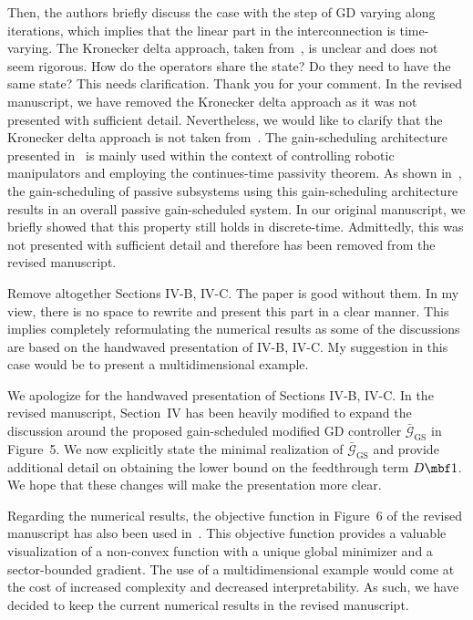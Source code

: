 \begin{rebuttal}[pending]
    {%
        Then, the authors briefly discuss the case with the step of GD varying along iterations, which implies that the linear part in the interconnection is time-varying. The Kronecker delta approach, taken from~\cite{Damaren_spr_gain_scheduling_1996}, is unclear and does not seem rigorous. How do the operators share the state? Do they need to have the same state? This needs clarification. 
    }%
    {%
        Thank you for your comment. In the revised manuscript, we have removed the Kronecker delta approach as it was not presented with sufficient detail. Nevertheless, we would like to clarify that the Kronecker delta approach is not taken from~\cite{Damaren_spr_gain_scheduling_1996}. The gain-scheduling architecture presented in~\cite{Damaren_spr_gain_scheduling_1996} is mainly used within the context of controlling robotic manipulators and employing the continues-time passivity theorem. As shown in~\cite{Damaren_spr_gain_scheduling_1996}, the gain-scheduling of passive subsystems using this gain-scheduling architecture results in an overall passive gain-scheduled system. In our original manuscript, we briefly showed that this property still holds in discrete-time. Admittedly, this was not presented with sufficient detail and therefore has been removed from the revised manuscript.
    }%
\end{rebuttal}
\begin{rebuttal}[pending]
    {%
        Remove altogether Sections IV-B, IV-C. The paper is good without them. In my view, there is no space to rewrite and present this part in a clear manner. This implies completely reformulating the numerical results as some of the discussions are based on the handwaved presentation of IV-B, IV-C. My suggestion in this case would be to present a multidimensional example. 
    }%
    {%
        We apologize for the handwaved presentation of Sections IV-B, IV-C. In the revised manuscript, Section~IV has been heavily modified to expand the discussion around the proposed gain-scheduled modified GD controller \(\bar{\bm{\mathcal{G}}}_{\textrm{GS}}\) in Figure~5. We now explicitly state the minimal realization of \(\bar{\bm{\mathcal{G}}}_{\textrm{GS}}\) and provide additional detail on obtaining the lower bound on the feedthrough term \(D\eye\). We hope that these changes will make the presentation more clear.

        Regarding the numerical results, the objective function in Figure~6 of the revised manuscript has also been used in~\cite{ugrinovskii,alex_petersen}. This objective function provides a valuable visualization of a non-convex function with a unique global minimizer and a sector-bounded gradient. The use of a multidimensional example would come at the cost of increased complexity and decreased interpretability. As such, we have decided to keep the current numerical results in the revised manuscript.
    }%
\end{rebuttal}
